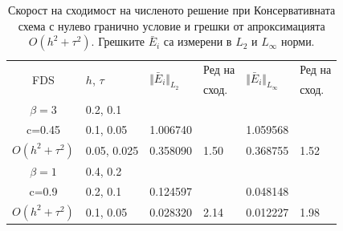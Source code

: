\documentclass{article}
\theoremstyle{remark}
\begin{document}
\begin{table}[ht]
\centering
\small
		\begin{tabular}{||c|l|ll|ll||}
			\hline
			\hline
      \multirow{2  }{*}{FDS}        & \multirow{2  }{*}{$h$, $\tau$}  &	\multirow{2  }{*}{  $\Vert \bar E_i \Vert_{L_2} $ } 	&Ред на & \multirow{2  }{*}{  $\Vert \bar E_i \Vert_{L_\infty}$ }	&Ред на   \\
	                                        &                                                &    										&  сход. & 										& сход. \\
   			\hline 
					\hline 
  $\beta=3$                &0.2, 0.1         &                    &                &                  &                   \\
   c=0.45                     &0.1, 0.05         & 1.006740   &                & 1.059568 &                   \\
     $O(h^2 + \tau^ 2)$ &0.05, 0.025  &0.358090    	& 1.50       	& 0.368755   &   1.52   \\
	   \hline
			\hline 
       $\beta=1$           & 0.4, 0.2       &                   &           &                 &   \\
                  c=0.9       & 0.2, 0.1        & 0.124597   &          &0.048148  &   \\
  $O(h^2+ \tau^2)$  & 0.1, 0.05       & 0.028320   & 2.14  &0.012227  & 1.98 \\
	   \hline
			\hline 
		\end{tabular}
		\caption{Скорост на сходимост на численото решение при Консервативната схема с нулево гранично условие и грешки от апроксимацията $O(h^{2} + \tau^2 )$. Грешките $\bar E_i$ са измерени в $L_2$ и $L_\infty$ норми.}
\label{tableC}
\end{table}
\end{document}
